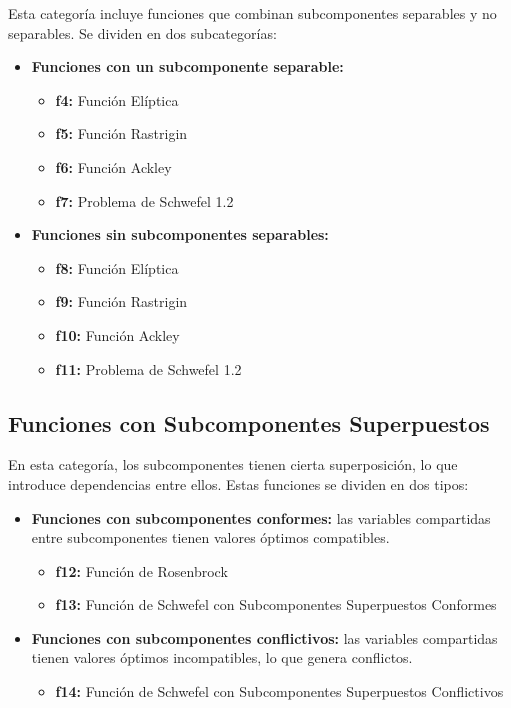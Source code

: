 Esta categoría incluye funciones que combinan subcomponentes separables y no separables. Se dividen en dos subcategorías:
\begin{itemize}
    \item \textbf{Funciones con un subcomponente separable:}
    \begin{itemize}
        \item \textbf{f4:} Función Elíptica
        \item \textbf{f5:} Función Rastrigin
        \item \textbf{f6:} Función Ackley
        \item \textbf{f7:} Problema de Schwefel 1.2
    \end{itemize}
    \item \textbf{Funciones sin subcomponentes separables:}
    \begin{itemize}
        \item \textbf{f8:} Función Elíptica
        \item \textbf{f9:} Función Rastrigin
        \item \textbf{f10:} Función Ackley
        \item \textbf{f11:} Problema de Schwefel 1.2
    \end{itemize}
\end{itemize}

\subsection{Funciones con Subcomponentes Superpuestos}

En esta categoría, los subcomponentes tienen cierta superposición, lo que introduce dependencias entre ellos. Estas funciones se dividen en dos tipos:
\begin{itemize}
    \item \textbf{Funciones con subcomponentes conformes:} las variables compartidas entre subcomponentes tienen valores óptimos compatibles.
    \begin{itemize}
        \item \textbf{f12:} Función de Rosenbrock
        \item \textbf{f13:} Función de Schwefel con Subcomponentes Superpuestos Conformes
    \end{itemize}
    \item \textbf{Funciones con subcomponentes conflictivos:} las variables compartidas tienen valores óptimos incompatibles, lo que genera conflictos.
    \begin{itemize}
        \item \textbf{f14:} Función de Schwefel con Subcomponentes Superpuestos Conflictivos
    \end{itemize}
\end{itemize}


